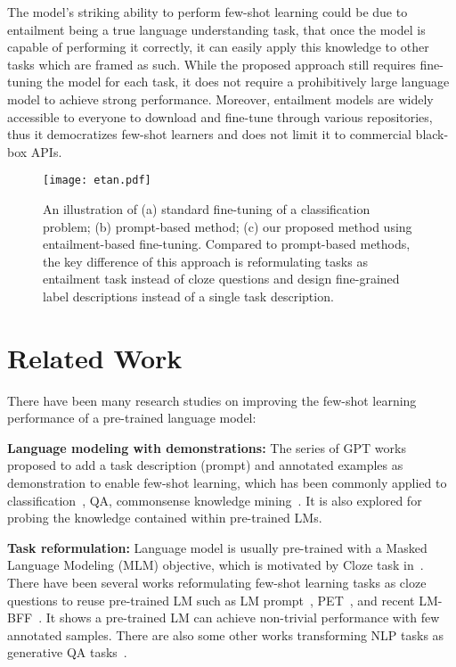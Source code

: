 \documentclass{article}
\begin{document}
The model's striking ability to perform few-shot learning could be due to entailment being a true language understanding task, that once the model is capable of performing it correctly, it can easily apply this knowledge to other tasks which are framed as such. While the proposed approach still requires fine-tuning the model for each task, it does not require a prohibitively large language model to achieve strong performance. Moreover, entailment models are widely accessible to everyone to download and fine-tune through various repositories, thus it democratizes few-shot learners and does not limit it to commercial black-box APIs. 



\begin{figure*}[t]
  \centering
  \texttt{[image: etan.pdf]}
  \caption{An illustration of (a) standard fine-tuning of a classification problem; (b) prompt-based method; (c) our proposed method using entailment-based fine-tuning. Compared to prompt-based methods, the key difference of this approach is reformulating tasks as entailment task instead of cloze questions and design fine-grained label descriptions instead of a single task description.}
  \label{fig:architecture}
\end{figure*}
\section{Related Work}

There have been many research studies on improving the few-shot learning performance of a pre-trained language model:

\textbf{Language modeling with demonstrations:} The series of GPT works~\citep{radford2019language,brown2020language} proposed to add a task description (prompt) and annotated examples as demonstration to enable few-shot learning, which has been commonly applied to classification~\citep{puri2019zero}, QA, commonsense knowledge mining~\citep{davison2019commonsense}. It is also explored for probing the knowledge contained within pre-trained LMs.

\textbf{Task reformulation:} Language model is usually pre-trained with a Masked Language Modeling (MLM) objective, which is motivated by Cloze task in~\citep{taylor1953cloze}. There have been several works reformulating few-shot learning tasks as cloze questions to reuse pre-trained LM such as LM prompt~\citep{jiang2020can}, PET~\citep{radford2019language,schick2020exploiting}, and recent LM-BFF~\citep{gao2020making}. It shows a pre-trained LM can achieve non-trivial performance with few annotated samples. There are also some other works transforming NLP tasks as generative QA tasks~\citep{puri2019zero}.
\end{document}
